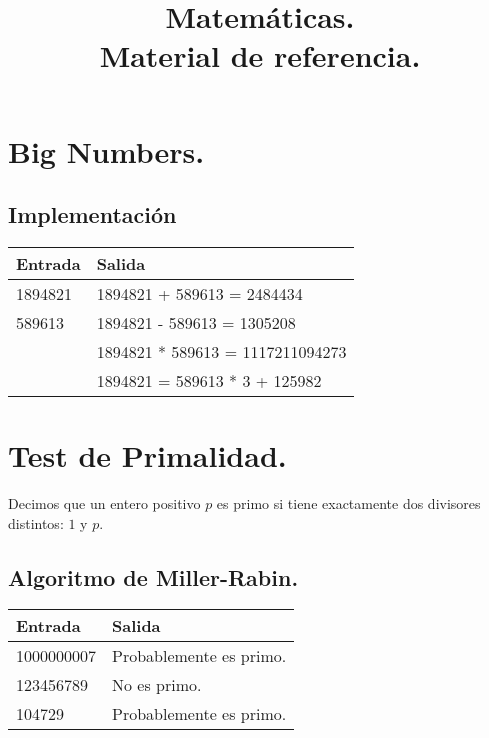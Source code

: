 \documentclass[12pt, letterpaper, twoside]{article}
\title{Matemáticas.\\
	  \large Material de referencia.}
\author{}
\date{}
\begin{document}
\maketitle

\tableofcontents

\newpage

\section{Big Numbers.}

\subsection{Implementación}

 \medskip

\begin{tabular}{|p{7cm}|p{7cm}|}
\hline
\textbf{Entrada} & \textbf{Salida}\\ \hline
1894821 & 1894821 + 589613 = 2484434\\
589613  & 1894821 - 589613 = 1305208\\ 
        & 1894821 * 589613 = 1117211094273\\ 
        & 1894821 = 589613 * 3 + 125982\\ \hline
\end{tabular}

\newpage

\section{Test de Primalidad.}

Decimos que un entero positivo $p$ es primo si tiene exactamente dos divisores distintos: $1$ y $p$.

\subsection{Algoritmo de Miller-Rabin.}

 \medskip

\begin{tabular}{|p{7cm}|p{7cm}|}
\hline
\textbf{Entrada} & \textbf{Salida}\\ \hline
1000000007 & Probablemente es primo.\\
123456789  & No es primo.\\
104729     & Probablemente es primo.\\ \hline
\end{tabular}
\end{document}
